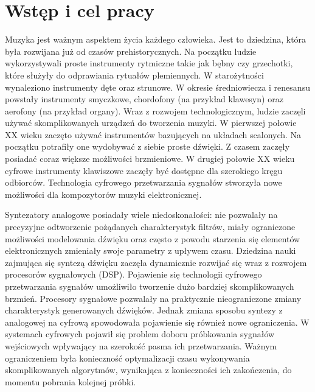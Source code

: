 \chapter{Wstęp i cel pracy}
Muzyka jest ważnym aspektem życia każdego człowieka. Jest to dziedzina, która była rozwijana już od czasów prehistorycznych. %
Na początku ludzie wykorzystywali proste instrumenty rytmiczne takie jak bębny czy grzechotki, które służyły do odprawiania rytuałów plemiennych. W starożytności wynaleziono instrumenty dęte oraz strunowe. W okresie średniowiecza i renesansu powstały instrumenty smyczkowe, chordofony (na przykład klawesyn) oraz aerofony (na przykład organy).
Wraz z rozwojem technologicznym, ludzie zaczęli używać skomplikowanych urządzeń do tworzenia muzyki. W pierwszej połowie XX wieku zaczęto używać instrumentów bazujących na układach scalonych. \cite{historia_instr}
Na początku potrafiły one wydobywać z siebie proste dźwięki. Z czasem zaczęły posiadać coraz większe możliwości brzmieniowe. W drugiej połowie XX wieku cyfrowe instrumenty klawiszowe zaczęły być dostępne dla szerokiego kręgu odbiorców. Technologia cyfrowego przetwarzania sygnałów stworzyła nowe możliwości dla kompozytorów muzyki elektronicznej.

Syntezatory analogowe posiadały wiele niedoskonałości: nie pozwalały na precyzyjne odtworzenie pożądanych charakterystyk filtrów, miały ograniczone możliwości modelowania dźwięku oraz często z powodu starzenia się elementów elektronicznych zmieniały swoje parametry z upływem czasu. Dziedzina nauki zajmująca się syntezą dźwięku zaczęła dynamicznie rozwijać się wraz z rozwojem procesorów sygnałowych (DSP). Pojawienie się technologii cyfrowego przetwarzania sygnałów umożliwiło tworzenie dużo bardziej skomplikowanych brzmień. Procesory sygnałowe pozwalały na praktycznie nieograniczone zmiany charakterystyk generowanych dźwięków. Jednak zmiana sposobu syntezy z analogowej na cyfrową spowodowała pojawienie się również nowe ograniczenia. W systemach cyfrowych pojawił się problem doboru próbkowania sygnałów wejściowych wpływający na szerokość pasma ich przetwarzania.
Ważnym ograniczeniem była konieczność optymalizacji czasu wykonywania skomplikowanych algorytmów, wynikająca z konieczności ich zakończenia, do momentu pobrania kolejnej próbki.

